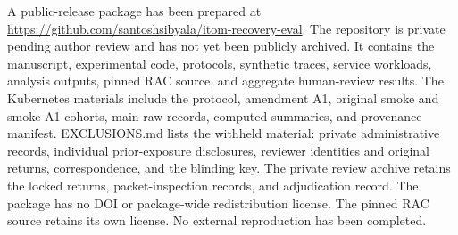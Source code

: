 \documentclass[conference,10pt]{IEEEtran}
\begin{document}
A public-release package has been prepared at \url{https://github.com/santoshsibyala/itom-recovery-eval}. The repository is private pending author review and has not yet been publicly archived. It contains the manuscript, experimental code, protocols, synthetic traces, service workloads, analysis outputs, pinned RAC source, and aggregate human-review results. The Kubernetes materials include the protocol, amendment A1, original smoke and smoke-A1 cohorts, main raw records, computed summaries, and provenance manifest. EXCLUSIONS.md lists the withheld material: private administrative records, individual prior-exposure disclosures, reviewer identities and original returns, correspondence, and the blinding key. The private review archive retains the locked returns, packet-inspection records, and adjudication record. The package has no DOI or package-wide redistribution license. The pinned RAC source retains its own license. No external reproduction has been completed.
\end{document}
